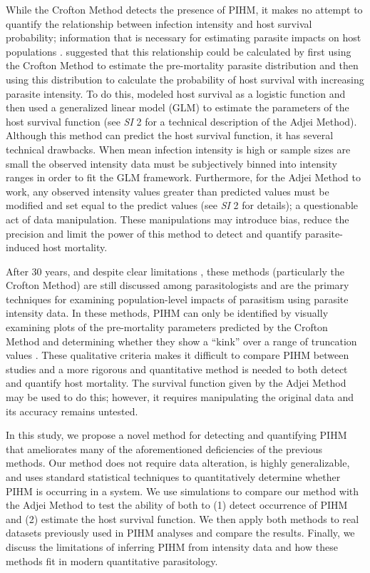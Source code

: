 \documentclass[12pt, a4paper]{article}
\begin{document}
While the Crofton Method detects the presence of PIHM, it makes no attempt to
quantify the relationship between infection intensity and host survival
probability; information that is necessary for estimating parasite impacts on host populations \citep{AndersonandMay1978,Tompkins2002}. \cite{Adjei1986}
suggested that this relationship could be calculated by first using the Crofton
Method to estimate the pre-mortality parasite distribution and then using this
distribution to calculate the probability of host survival with increasing
parasite intensity. To do this, \cite{Adjei1986} modeled host survival as a
logistic function and then used a generalized linear model (GLM) to estimate
the parameters of the host survival function (see \emph{SI} 2 for a technical
description of the Adjei Method).  Although this method can predict the host survival function, it has several technical drawbacks. When mean infection intensity is high or sample sizes
are small the observed intensity data must be subjectively binned into
intensity ranges in order to fit the GLM framework. Furthermore, for the Adjei
Method to work, any observed intensity values greater than predicted values
must be modified and set equal to the predict values (see \emph{SI} 2 for
details); a questionable act of data manipulation. These manipulations may introduce bias, reduce the precision and
limit the power of this method to detect and quantify parasite-induced host
mortality.

After 30 years, and despite clear limitations \citep{McCallum2000a}, these
methods (particularly the Crofton Method) are still discussed among
parasitologists and are the primary techniques for examining population-level
impacts of parasitism using parasite intensity data. In these methods, PIHM can only be identified by visually examining plots of the pre-mortality parameters predicted by the Crofton Method and determining whether they show a ``kink'' over a range of truncation values \citep[Figure \ref{fig:crofton}B;][]{Lester1984,Ferguson2011}. These qualitative criteria makes it difficult to compare PIHM between studies and a more rigorous and quantitative method is needed to both detect and quantify host mortality. The survival function given by the Adjei
Method may be used to do this; however, it requires manipulating the
original data and its accuracy remains untested.

In this study, we propose a novel method for detecting and quantifying PIHM that ameliorates many of the aforementioned deficiencies of the previous methods. Our method does not require data alteration, is highly generalizable, and uses standard statistical techniques to quantitatively determine whether PIHM is occurring in a system.  We
use simulations to compare our method with the Adjei
Method to test the ability of both to (1) detect occurrence of PIHM and (2) estimate the host survival function.  We then
apply both methods to real datasets previously used in PIHM analyses and
compare the results. Finally, we discuss the limitations of inferring PIHM
from intensity data and how these methods fit in modern quantitative parasitology.
\end{document}

